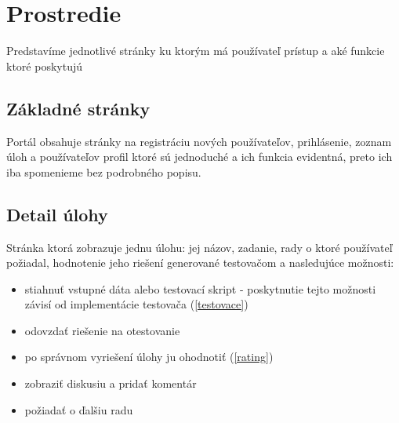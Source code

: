 \section{Prostredie}
Predstavíme jednotlivé stránky ku ktorým má používateľ prístup a aké
funkcie ktoré poskytujú

\subsection{Základné stránky}
Portál obsahuje stránky na registráciu nových používateľov, prihlásenie, zoznam úloh a
používateľov profil ktoré sú jednoduché a ich funkcia evidentná, preto ich iba spomenieme
bez podrobného popisu.

\subsection{Detail úlohy}
Stránka ktorá zobrazuje jednu úlohu: jej názov, zadanie, rady o ktoré používateľ požiadal, hodnotenie jeho riešení
generované testovačom a nasledujúce možnosti:
\begin{itemize}
  \item stiahnuť vstupné dáta alebo testovací skript - poskytnutie tejto možnosti závisí od implementácie testovača (\ref{testovace})
  \item odovzdať riešenie na otestovanie
  \item po správnom vyriešení úlohy ju ohodnotiť (\ref{rating})
  \item zobraziť diskusiu a pridať komentár
  \item požiadať o ďalšiu radu
\end{itemize}
